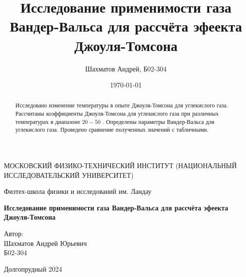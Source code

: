 \documentclass[a4paper,12pt]{report}
\title{Исследование применимости газа Вандер-Вальса для рассчёта эфеекта Джоуля-Томсона}
\author{Шахматов Андрей, Б02-304}
\date{\today}
\begin{document}
\begin{titlepage}
    \begin{center}
        {\large МОСКОВСКИЙ ФИЗИКО-ТЕХНИЧЕСКИЙ ИНСТИТУТ (НАЦИОНАЛЬНЫЙ ИССЛЕДОВАТЕЛЬСКИЙ УНИВЕРСИТЕТ)}
    \end{center}
    \begin{center}
        {\large Физтех-школа физики и исследований им. Ландау}
    \end{center}
    
    
    \vspace{3cm}
    {\huge
        \begin{center}
            \textbf{Исследование применимости газа Вандер-Вальса для рассчёта эфеекта Джоуля-Томсона}
        \end{center}
    }
    \vspace{2cm}
    \begin{flushright}
        {\LARGE Автор:\\ Шахматов Андрей Юрьевич \\
            \vspace{0.2cm}
            Б02-304}
    \end{flushright}
    \vspace{7 cm}
    \begin{center}
        Долгопрудный 2024
    \end{center}
\end{titlepage}

\pagestyle{fancy}

    \fancyhead{}
    \fancyfoot{}
    \fancyhead[L]{\rightmark}
    \fancyhead[R]{\thepage}


\begin{abstract}
    Исследовано изменение температуры в опыте Джоуля-Томсона для углекислого газа. Рассчитаны 
    коэффициенты Джоуля-Томсона для углекислого газа при различных температурах в диапазоне $20 - 50$ 
    \textcelsius. Определены параметры Вандер-Вальса для углекислого газа. Проведено сравнение 
    полученных значений с табличными.      
\end{abstract}
\tableofcontents
\end{document}
